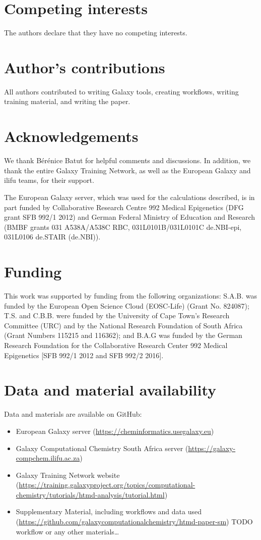 \documentclass[twocolumn]{bmcart}%
\begin{document}
\begin{backmatter}

\section*{Competing interests}
  The authors declare that they have no competing interests.

\section*{Author's contributions}
All authors contributed to writing Galaxy tools, creating workflows, writing training material, and writing the paper.

\section*{Acknowledgements}
We thank Bérénice Batut for helpful comments and discussions. In addition, we thank the entire Galaxy Training Network, as well as the European Galaxy and ilifu teams, for their support.

The European Galaxy server, which was used for the calculations described, is in part funded by Collaborative Research Centre 992 Medical Epigenetics (DFG grant SFB 992/1 2012) and German Federal Ministry of Education and Research (BMBF grants 031 A538A/A538C RBC, 031L0101B/031L0101C de.NBI-epi, 031L0106 de.STAIR (de.NBI)).

\section*{Funding}
This work was supported by funding from the following organizations: S.A.B. was funded by the European Open Science Cloud (EOSC-Life) (Grant No. 824087);  T.S. and C.B.B. were funded by the University of Cape Town’s Research Committee (URC) and by the National Research Foundation of South Africa (Grant Numbers 115215 and 116362); and B.A.G was funded by the German Research Foundation for the Collaborative Research Center 992 Medical Epigenetics [SFB 992/1 2012 and SFB 992/2 2016].

\section*{Data and material availability}
  Data and materials are available on GitHub:

  \begin{itemize}
  \item European Galaxy server (\url{https://cheminformatics.usegalaxy.eu}) 
  \item Galaxy Computational Chemistry South Africa server (\url{https://galaxy-compchem.ilifu.ac.za})
  \item Galaxy Training Network website (\url{https://training.galaxyproject.org/topics/computational-chemistry/tutorials/htmd-analysis/tutorial.html})
  \item Supplementary Material, including workflows and data used (\url{https://github.com/galaxycomputationalchemistry/htmd-paper-sm})  TODO workflow or any other materials\ldots
\end{itemize}



\end{backmatter}
\end{document}
